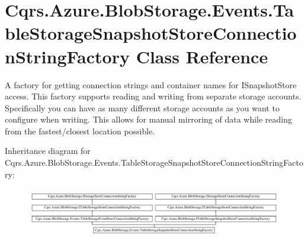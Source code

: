 \hypertarget{classCqrs_1_1Azure_1_1BlobStorage_1_1Events_1_1TableStorageSnapshotStoreConnectionStringFactory}{}\section{Cqrs.\+Azure.\+Blob\+Storage.\+Events.\+Table\+Storage\+Snapshot\+Store\+Connection\+String\+Factory Class Reference}
\label{classCqrs_1_1Azure_1_1BlobStorage_1_1Events_1_1TableStorageSnapshotStoreConnectionStringFactory}


A factory for getting connection strings and container names for I\+Snapshot\+Store access. This factory supports reading and writing from separate storage accounts. Specifically you can have as many different storage accounts as you want to configure when writing. This allows for manual mirroring of data while reading from the fastest/closest location possible.  


Inheritance diagram for Cqrs.\+Azure.\+Blob\+Storage.\+Events.\+Table\+Storage\+Snapshot\+Store\+Connection\+String\+Factory\+:\begin{figure}[H]
\begin{center}
\leavevmode
\includegraphics[height=2.235529cm]{classCqrs_1_1Azure_1_1BlobStorage_1_1Events_1_1TableStorageSnapshotStoreConnectionStringFactory}
\end{center}
\end{figure}
